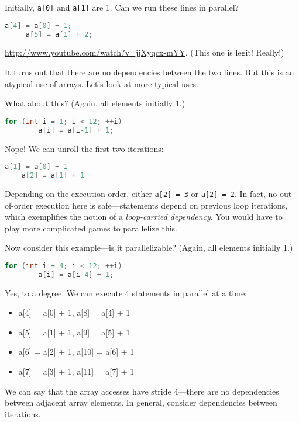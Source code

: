 Initially, {\tt a[0]} and {\tt a[1]} are 1.
Can we run these lines in parallel?

\begin{lstlisting}[language=C]
     a[4] = a[0] + 1;
     a[5] = a[1] + 2;
\end{lstlisting}

\url{http://www.youtube.com/watch?v=jjXyqcx-mYY}. (This one is legit! Really!)

It turns out that there are no dependencies between the two lines. But this is
an atypical use of arrays. Let's look at more typical uses.


What about this? (Again, all elements initially 1.)

\begin{lstlisting}[language=C]
    for (int i = 1; i < 12; ++i)
        a[i] = a[i-1] + 1;
\end{lstlisting}

Nope! We can unroll the first two iterations:
\begin{lstlisting}[language=C]
    a[1] = a[0] + 1
    a[2] = a[1] + 1
\end{lstlisting}

Depending on the execution order, either {\tt a[2] = 3} or {\tt a[2] =
  2}.  In fact, no out-of-order execution here is safe---statements depend
on previous loop iterations, which exemplifies the notion of a
\emph{loop-carried dependency}. You would have
to play more complicated games to parallelize this.


  Now consider this example---is it parallelizable? (Again, all elements initially 1.)

\begin{lstlisting}[language=C]
    for (int i = 4; i < 12; ++i)
        a[i] = a[i-4] + 1;
\end{lstlisting}

Yes, to a degree. We can execute 4 statements in parallel at a time:
\begin{itemize}
  \item a[4] = a[0] + 1, a[8] = a[4] + 1
  \item a[5] = a[1] + 1, a[9] = a[5] + 1
  \item a[6] = a[2] + 1, a[10] = a[6] + 1
  \item a[7] = a[3] + 1, a[11] = a[7] + 1
\end{itemize}  
We can say that the array accesses have stride 4---there are no
dependencies between adjacent array elements. In general, consider
dependencies between iterations.

